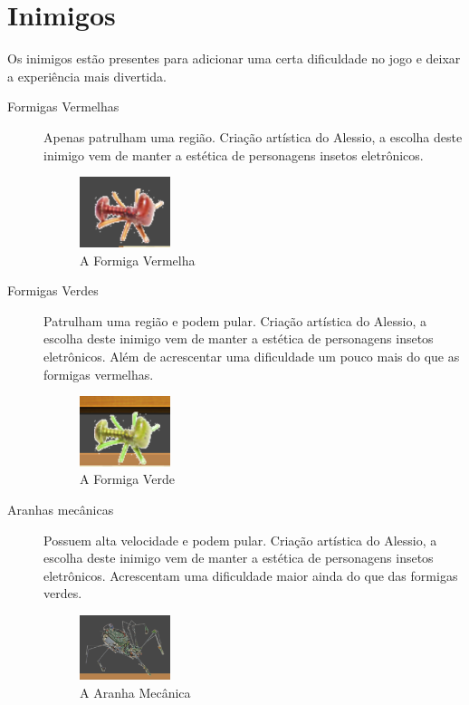 \section{Inimigos}
Os inimigos estão presentes para adicionar uma certa dificuldade no jogo e deixar a experiência mais divertida.
\begin{description}
    \item[Formigas Vermelhas] Apenas patrulham uma região. Criação artística do Alessio, a escolha deste inimigo vem de manter a estética de personagens insetos eletrônicos. 
    \begin{figure}[h]
        \centering
        \includegraphics[width=100px]{figuras/redant.png}
        \caption{A Formiga Vermelha}
        \label{fig_redant}
    \end{figure}

    \item[Formigas Verdes] Patrulham uma região e podem pular. Criação artística do Alessio, a escolha deste inimigo vem de manter a estética de personagens insetos eletrônicos. Além de acrescentar uma dificuldade um pouco mais do que as formigas vermelhas.
    \begin{figure}[h]
        \centering
        \includegraphics[width=100px]{figuras/greenant.png}
        \caption{A Formiga Verde}
        \label{fig_greenant}
    \end{figure}
    
    \item[Aranhas mecânicas] Possuem alta velocidade e podem pular. Criação artística do Alessio, a escolha deste inimigo vem de manter a estética de personagens insetos eletrônicos. Acrescentam uma dificuldade maior ainda do que das formigas verdes.
    \begin{figure}[h]
        \centering
        \includegraphics[width=100px]{figuras/spider.png}
        \caption{A Aranha Mecânica}
        \label{fig_spider}
    \end{figure}
\end{description}


